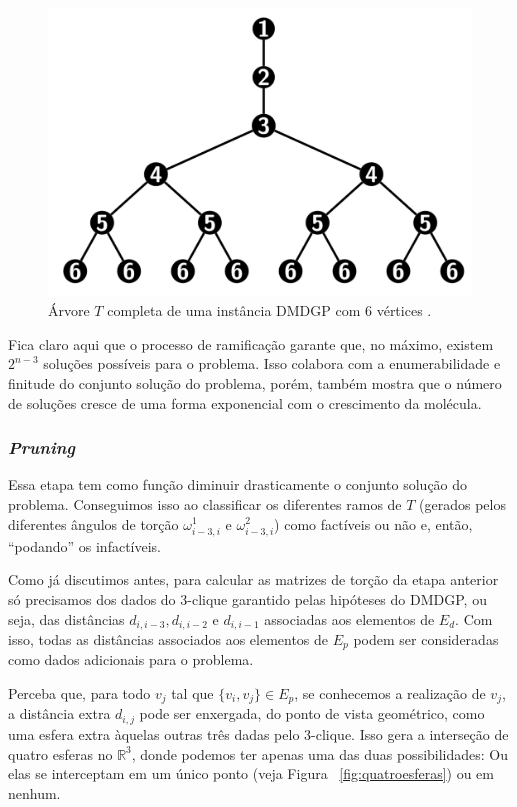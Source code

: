 \documentclass[a4paper,12pt]{article}
\begin{document}
	\begin{figure}[H]
		\begin{center}
			\includegraphics[width=0.45\linewidth]{ramificacoes.png}
		\end{center}
		\caption{Árvore $T$ completa de uma instância DMDGP com 6 vértices \cite{fidalgotese}.}
		\label{fig:ramificacoes}
	\end{figure}
	
	Fica claro aqui que o processo de ramificação garante que, no máximo, existem $2^{n-3}$ soluções possíveis para o problema. Isso colabora com a enumerabilidade e finitude do conjunto solução do problema, porém, também mostra que o número de soluções cresce de uma forma exponencial com o crescimento da molécula.
	
	\subsubsection*{\textit{Pruning}}
	Essa etapa tem como função diminuir drasticamente o conjunto solução do problema. Conseguimos isso ao classificar os diferentes ramos de $T$ (gerados pelos diferentes ângulos de torção $\omega_{i-3,i}^1$ e $\omega_{i-3,i}^2$) como factíveis ou não e, então, ``podando'' os infactíveis.  
	
	Como já discutimos antes, para calcular as matrizes de torção da etapa anterior só precisamos dos dados do 3-clique garantido pelas hipóteses do DMDGP, ou seja, das distâncias $d_{i,i-3}, d_{i,i-2}$ e $d_{i,i-1}$ associadas aos elementos de $E_d$. Com isso, todas as distâncias associados aos elementos de $E_p$ podem ser consideradas como dados adicionais para o problema. 
	
	Perceba que, para todo $v_j$ tal que $\{v_i,v_j\} \in E_p$, se conhecemos a realização de $v_j$, a distância extra $d_{i,j}$ pode ser enxergada, do ponto de vista geométrico, como uma esfera extra àquelas outras três dadas pelo 3-clique. Isso gera a interseção de quatro esferas no $\mathbb{R}^3$, donde podemos ter apenas uma das duas possibilidades: Ou elas se interceptam em um único ponto (veja Figura ~\ref{fig:quatroesferas}) ou em nenhum. 
\end{document}
